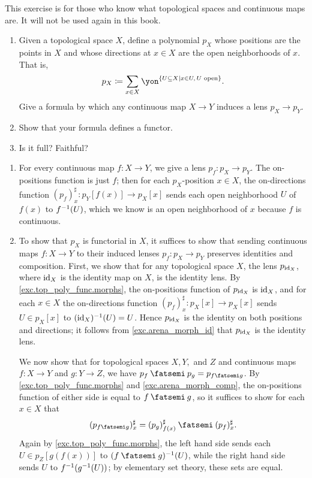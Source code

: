 \documentclass[Book-Poly]{subfiles}
\begin{document}
\begin{exercise} \label{exc.top_poly_func}
This exercise is for those who know what topological spaces and continuous maps are. It will not be used again in this book.
\begin{enumerate}
	\item Given a topological space $X$, define a polynomial $p_X$ whose positions are the points in $X$ and whose directions at $x\in X$ are the open neighborhoods of $x$.
  That is,
  \[
    p_X\coloneqq\sum_{x \in X}\yon^{\{ U\ss X \mid x\in U, \, U\text{ open} \}}.
  \]
  Give a formula by which any continuous map $X\to Y$ induces a lens $p_X\to p_Y$.
	\item Show that your formula defines a functor.
	\item Is it full? Faithful?
\qedhere
\end{enumerate}
\begin{solution}
\begin{enumerate}
	\item \label{exc.top_poly_func.morphs} For every continuous map $f \colon X \to Y$, we give a lens $p_f \colon p_X \to p_Y$.
	The on-positions function is just $f$; then for each $p_X$-position $x\in X$, the on-directions function $(p_f)^\sharp_x\colon p_Y[f(x)]\to p_X[x]$ sends each open neighborhood $U$ of $f(x)$ to $f^{-1}(U)$, which we know is an open neighborhood of $x$ because $f$ is continuous.

	\item To show that $p_X$ is functorial in $X$, it suffices to show that sending continuous maps $f\colon X\to Y$ to their induced lenses $p_f\colon p_X\to p_Y$ preserves identities and composition.
	First, we show that for any topological space $X$, the lens $p_{\mathrm{id}_X}$, where $\mathrm{id}_X$ is the identity map on $X$, is the identity lens.
	By \cref{exc.top_poly_func.morphs}, the on-positions function of $p_{\mathrm{id}_X}$ is $\mathrm{id}_X$, and for each $x\in X$ the on-directions function $(p_f)^\sharp_x\colon p_X[x]\to p_X[x]$ sends $U\in p_X[x]$ to $(\mathrm{id}_X)^{-1}(U) = U$.
	Hence $p_{\mathrm{id}_X}$ is the identity on both positions and directions; it follows from \cref{exc.arena_morph_id} that $p_{\mathrm{id}_X}$ is the identity lens.

	We now show that for topological spaces $X,Y,$ and $Z$ and continuous maps $f\colon X\to Y$ and $g\colon Y\to Z$, we have $p_f\then p_g = p_{f\then g}$.
	By \cref{exc.top_poly_func.morphs} and \cref{exc.arena_morph_comp}, the on-positions function of either side is equal to $f\then g$, so it suffices to show for each $x\in X$ that
	\[
	    (p_{f \then g})^\sharp_x = (p_g)^\sharp_{f(x)} \then (p_f)^\sharp_x.
	\]
	Again by \cref{exc.top_poly_func.morphs}, the left hand side sends each $U\in p_Z[g(f(x))]$ to $(f \then g)\inv(U)$, while the right hand side sends $U$ to $f^{-1}(g^{-1}(U))$; by elementary set theory, these sets are equal.


\end{enumerate}
\end{solution}
\end{exercise}
\end{document}
